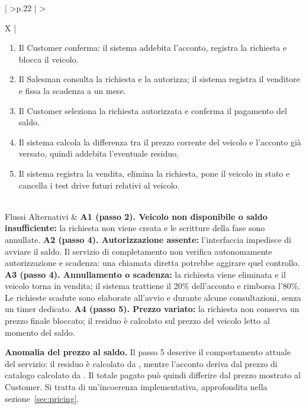 \begin{xltabular}{\textwidth}{| >{\bfseries}p{.22\textwidth} | >{\raggedright\arraybackslash}X |}
\begin{enumerate}[label=\arabic*.,start=1,leftmargin=*,nosep]
  \item Il Customer conferma: il sistema addebita l'acconto, registra la richiesta e blocca il veicolo.
  \item Il Salesman consulta la richiesta e la autorizza; il sistema registra il venditore e fissa la scadenza a un mese.
  \item Il Customer seleziona la richiesta autorizzata e conferma il pagamento del saldo.
  \item Il sistema calcola la differenza tra il prezzo corrente del veicolo e l'acconto già versato, quindi addebita l'eventuale residuo.
  \item Il sistema registra la vendita, elimina la richiesta, pone il veicolo in stato  e cancella i test drive futuri relativi al veicolo.
\end{enumerate}\\\hline
Flussi Alternativi &
\textbf{A1 (passo 2). Veicolo non disponibile o saldo insufficiente:} la richiesta non viene creata e le scritture della fase sono annullate.\newline\newline
\textbf{A2 (passo 4). Autorizzazione assente:} l'interfaccia impedisce di avviare il saldo. Il servizio di completamento non verifica autonomamente autorizzazione e scadenza: una chiamata diretta potrebbe aggirare quel controllo.\newline\newline
\textbf{A3 (passo 4). Annullamento o scadenza:} la richiesta viene eliminata e il veicolo torna in vendita; il sistema trattiene il 20\% dell'acconto e rimborsa l'80\%. Le richieste scadute sono elaborate all'avvio e durante alcune consultazioni, senza un timer dedicato.\newline\newline
\textbf{A4 (passo 5). Prezzo variato:} la richiesta non conserva un prezzo finale bloccato; il residuo è calcolato sul prezzo del veicolo letto al momento del saldo.\\\hline
\end{xltabular}
\noindent\textbf{Anomalia del prezzo al saldo.} Il passo 5 descrive il comportamento attuale del servizio: il residuo è calcolato da , mentre l'acconto deriva dal prezzo di catalogo calcolato da . Il totale pagato può quindi differire dal prezzo mostrato al Customer. Si tratta di un'incoerenza implementativa, approfondita nella sezione~\ref{sec:pricing}.
